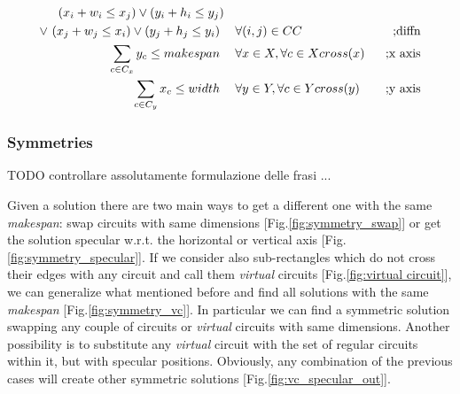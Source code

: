     \begin{align}
        (x_i + w_i \leq x_j) \lor (y_i + h_i \leq y_j) &\ \ &\ \nonumber \\
        \lor\ (x_j + w_j \leq x_i) \lor (y_j + h_j \leq y_i)\ &\                \hspace{0.2cm} \forall (i,j) \in CC &\ \text{;diffn} \\
        \sum_{c \in C_x} y_c \leq makespan\ &\ \hspace{0.2cm} \forall x \in X, \forall c \in Xcross(x)\ &\ \text{;x axis} \\
        \sum_{c \in C_y} x_c \leq width\ &\ \hspace{0.2cm} \forall y \in Y, \forall c \in Ycross(y)\ &\ \text{;y axis}
    \end{align}

    \subsubsection{Symmetries}
    \colorbox{BurntOrange}{TODO controllare assolutamente formulazione delle frasi ...}


        Given a solution there are two main ways to get a different one with the same \textit{makespan}:
        swap circuits with same dimensions [Fig.\ref{fig:symmetry_swap}] or get the solution specular w.r.t. the horizontal 
        or vertical axis [Fig.\ref{fig:symmetry_specular}].
        If we consider also sub-rectangles which do not cross their edges with any circuit and call them 
        \textit{virtual} circuits [Fig.\ref{fig:virtual circuit}], we can generalize what mentioned before and find all solutions with 
        the same \textit{makespan} [Fig.\ref{fig:symmetry_vc}].
        In particular we can find a symmetric solution swapping any couple of circuits or \textit{virtual} circuits 
        with same dimensions. Another possibility is to substitute any \textit{virtual} circuit with the set of regular circuits within it, 
        but with specular positions. Obviously, any combination of the previous cases will create other symmetric 
        solutions [Fig.\ref{fig:vc_specular_out}].

